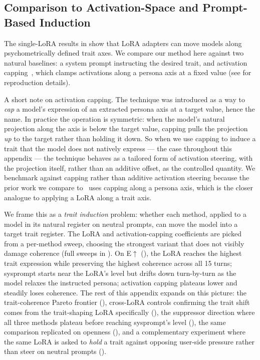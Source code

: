 \subsection{Comparison to Activation-Space and Prompt-Based Induction}\label{sec:comparison-induction}

The single-LoRA results in  show that LoRA adapters can move models along psychometrically defined trait axes. We compare our method here against two natural baselines: a system prompt instructing the desired trait, and activation capping~\citep{lu2026assistant}, which clamps activations along a persona axis at a fixed value (see  for reproduction details).

A short note on activation capping. The technique was introduced as a way to \emph{cap} a model's expression of an extracted persona axis at a target value, hence the name. In practice the operation is symmetric: when the model's natural projection along the axis is below the target value, capping pulls the projection \emph{up} to the target rather than holding it down. So when we use capping to induce a trait that the model does not natively express --- the case throughout this appendix --- the technique behaves as a tailored form of activation steering, with the projection itself, rather than an additive offset, as the controlled quantity. We benchmark against capping rather than additive activation steering because the prior work we compare to~\citep{lu2026assistant} uses capping along a persona axis, which is the closer analogue to applying a LoRA along a trait axis.

We frame this as a \emph{trait induction} problem: whether each method, applied to a model in its natural register on neutral prompts, can move the model into a target trait register. The LoRA and activation-capping coefficients are picked from a per-method sweep, choosing the strongest variant that does not visibly damage coherence (full sweeps in ). On E$\uparrow$ (), the LoRA reaches the highest trait expression while preserving the highest coherence across all 15 turns; sysprompt starts near the LoRA's level but drifts down turn-by-turn as the model relaxes the instructed persona; activation capping plateaus lower and steadily loses coherence. The rest of this appendix expands on this picture: the trait-coherence Pareto frontier (), cross-LoRA controls confirming the trait shift comes from the trait-shaping LoRA specifically (), the suppressor direction where all three methods plateau before reaching sysprompt's level (), the same comparison replicated on openness (), and a complementary experiment where the same LoRA is asked to \emph{hold} a trait against opposing user-side pressure rather than steer on neutral prompts ().

